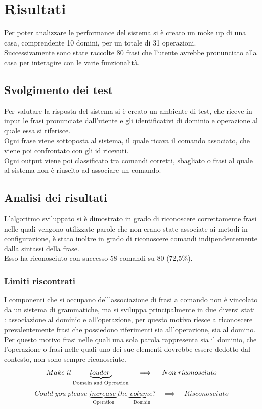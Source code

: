 \documentclass[twoside]{supsistudent}
\begin{document}
\chapter{Risultati}
Per poter analizzare le performance del sistema si è creato un moke up di una casa, comprendente 10 domini, per un totale di 31 operazioni. \\
Successivamente sono state raccolte 80 frasi che l'utente avrebbe pronunciato alla casa per interagire con le varie funzionalità.
\section{Svolgimento dei test}
Per valutare la risposta del sistema si è creato un ambiente di test, che riceve in input le frasi pronunciate dall'utente e gli identificativi di dominio e operazione al quale essa si riferisce.\\
Ogni frase viene sottoposta al sistema, il quale ricava il comando associato, che viene poi confrontato con gli id ricevuti.\\
Ogni output viene poi classificato tra comandi corretti, sbagliato o frasi al quale al sistema non è riuscito ad associare un comando.
\section{Analisi dei risultati}
L'algoritmo sviluppato si è dimostrato in grado di riconoscere correttamente frasi nelle quali vengono utilizzate parole che non erano state associate ai metodi in configurazione, è stato inoltre in grado di riconoscere comandi indipendentemente dalla sintassi della frase.\\
Esso ha riconosciuto con successo 58 comandi su 80 (72,5\%).
\subsection{Limiti riscontrati}
I componenti che si occupano dell'associazione di frasi a comando non è vincolato da un sistema di grammatiche, ma si sviluppa principalmente in due diversi stati : associazione al dominio e all'operazione, per questo motivo riesce a riconoscere prevalentemente frasi che possiedono riferimenti sia all'operazione, sia al domino. \\
Per questo motivo frasi nelle quali una sola parola rappresenta sia il dominio, che l'operazione o frasi nelle quali uno dei sue elementi dovrebbe essere dedotto dal contesto, non sono sempre riconosciute.
\[
 Make\;it
\underbrace{louder\;}_\text{Domain\;and\;Operation}
 \quad\implies\quad Non\;riconosciuto
\]
\[
 Could\;you\;please\;
\underbrace{increase\;}_\text{Operation}the
\underbrace{\;volume?}_\text{Domain}
 \quad\implies\quad Risconosciuto
\]
\end{document}
